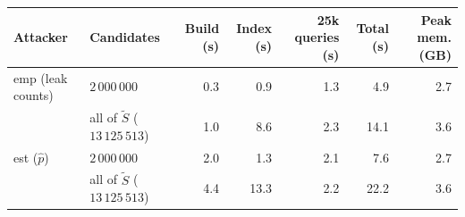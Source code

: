 \begin{tabular}{llrrrrr}
\toprule
Attacker & Candidates & Build (s) & Index (s) & 25k queries (s) & Total (s) & Peak mem. (GB) \\
\midrule
emp (leak counts) & $2\,000\,000$ & 0.3 & 0.9 & 1.3 & 4.9 & 2.7 \\
 & all of $\tilde S$ ($13\,125\,513$) & 1.0 & 8.6 & 2.3 & 14.1 & 3.6 \\
est ($\hat p$) & $2\,000\,000$ & 2.0 & 1.3 & 2.1 & 7.6 & 2.7 \\
 & all of $\tilde S$ ($13\,125\,513$) & 4.4 & 13.3 & 2.2 & 22.2 & 3.6 \\
\bottomrule
\end{tabular}
